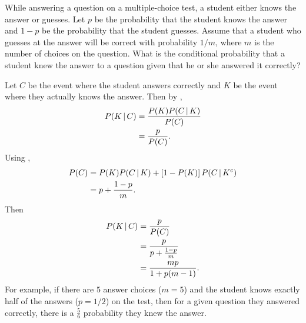 \begin{changebar}
    \begin{example}
        While answering a question on a multiple-choice test, a student either knows the answer or guesses. Let $p$ be the probability that the student knows the answer and $1-p$ be the probability that the student guesses. Assume that a student who guesses at the answer will be correct with probability $1/m$, where $m$ is the number of choices on the question. What is the conditional probability that a student knew the answer to a question given that he or she answered it correctly?
    \end{example}
    \begin{solution}
        Let $C$ be the event where the student answers correctly and $K$ be the event where they actually knows the answer. Then by , \[
            \begin{aligned}
                P(K \,\vert\, C) &= \frac{P(K)P(C \,\vert\, K)}{P(C)} \\
                &= \frac{p}{P(C)}.
            \end{aligned}    
        \] Using , \[
            \begin{aligned}
                P(C) &= P(K)P(C \,\vert\, K) + \left[ 1 - P(K) \right]P(C \,\vert\, K^c)    \\
                &= p + \frac{1-p}{m}.
            \end{aligned}
        \] Then \[
            \begin{aligned}
                P(K \,\vert\, C) &= \frac{p}{P(C)} \\
                &= \frac{p}{p + \frac{1-p}{m}} \\
                &= \frac{mp}{1 + p(m-1)}.
            \end{aligned}    
        \] For example, if there are $5$ answer choices ($m = 5$) and the student knows exactly half of the answers ($p = 1/2$) on the test, then for a given question they answered correctly, there is a $\frac{5}{6}$ probability they knew the answer.
    \end{solution} 
\end{changebar}

